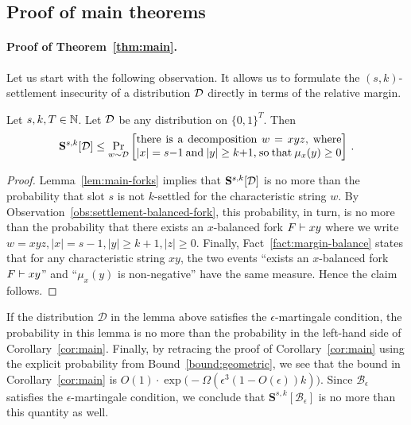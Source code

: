 \subsection{Proof of main theorems}\label{sec:thm-proofs}

\paragraph{Proof of Theorem~\ref{thm:main}.}

Let us start with the following observation.
It allows us to formulate the
$(s, k)$-settlement insecurity of a distribution $\mathcal{D}$
directly in terms of the relative margin.

\begin{lemma}\label{lemma:settlement-margin}
  Let $s, k, T \in \mathbb{N}$. 
  Let $\mathcal{D}$ be any distribution on $\{0,1\}^T$. 
  Then
  \[
    \mathbf{S}^{s,k}[\Distribution] \leq
      \Pr_{w \sim \Distribution} \left[\parbox{65mm}{
          there is a decomposition $w = x y z$, 
          where $|x| = s - 1$ and $|y| \geq k + 1$, 
          so that $\mu_x(y) \geq 0$
      }\right]
    \,.
  \]
\end{lemma}
\begin{proof}
  Lemma~\ref{lem:main-forks} implies that 
  $\mathbf{S}^{s,k}[\mathcal{D}]$ is no more than 
  the probability that slot $s$ is not $k$-settled 
  for the characteristic string $w$. 
  By Observation~\ref{obs:settlement-balanced-fork}, 
  this probability, in turn, is no more than 
  the probability that there exists an $x$-balanced fork 
  $F \vdash xy$
  where we write $w = xyz, |x| = s - 1, |y| \geq k + 1, |z| \geq 0$. 
  Finally, Fact~\ref{fact:margin-balance} states that 
  for any characteristic string $xy$, 
  the two events ``exists an $x$-balanced fork $F \vdash xy$'' 
  and ``$\mu_x(y)$ is non-negative'' have the same measure. 
  Hence the claim follows. 
\end{proof}

If the distribution $\mathcal{D}$ in the lemma above 
satisfies the $\epsilon$-martingale condition, 
the probability in this lemma is no more than the probability 
in the left-hand side of Corollary~\ref{cor:main}. 
Finally, by retracing the proof of Corollary~\ref{cor:main} 
using the explicit probability from Bound~\ref{bound:geometric}, 
we see that the bound in Corollary~\ref{cor:main} is 
$O(1) \cdot \exp\bigl(-\Omega(\epsilon^3 (1 - O(\epsilon))k)\bigr)$. 
Since $\mathcal{B}_\epsilon$ satisfies the $\epsilon$-martingale condition, 
we conclude that $\mathbf{S}^{s,k}[\mathcal{B}_\epsilon]$ is no more than 
this quantity as well.


